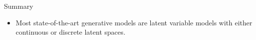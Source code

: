 \documentclass{beamer}
\begin{document}
\begin{frame}{Summary}
	\begin{itemize}
		\item Most state-of-the-art generative models are latent variable models with either continuous or discrete latent spaces.
	\end{itemize}
\end{frame}
\end{document}

